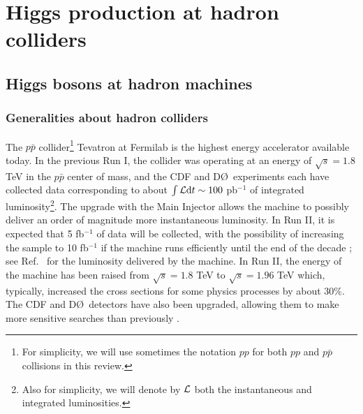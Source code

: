 
\section{Higgs production at hadron colliders}
\setcounter{equation}{0}
\renewcommand{\theequation}{3.\arabic{equation}}

\vspace*{-2mm}
\subsection{Higgs bosons at hadron machines}

\subsubsection{Generalities about hadron colliders}

The $p\bar{p}$ collider\footnote{For simplicity, we will use sometimes the
notation $pp$ for both $pp$ and $p\bar{p}$ collisions in this review.} Tevatron
at Fermilab is the highest energy accelerator available today. In the previous
Run I, the collider was operating at an energy of $\sqrt{s}=1.8$ TeV in the
$p\bar p$ center of mass, and the CDF and D\O\ experiments each have collected
data corresponding to about $\int {\cal L}{\rm d}t\sim 100$ pb$^{-1}$ of
integrated luminosity\footnote{Also for simplicity, we will denote by ${\cal
L}$ both the instantaneous and integrated luminosities.}. The upgrade with the
Main Injector allows the machine to possibly deliver an order of magnitude more
instantaneous luminosity. In Run II, it is expected that 5 fb$^{-1}$ of data
will be collected, with the possibility of increasing the sample to 10
fb$^{-1}$ if the machine runs efficiently until the end of the decade
\cite{Garbincius-Moriond};  see Ref.~\cite{Lumi-TeV} for the luminosity
delivered by the machine.  In Run II, the energy of the machine has been raised
from $\sqrt s = 1.8$ TeV to $\sqrt s = 1.96$ TeV which, typically, increased
the cross sections for some physics processes by about 30\%. The CDF and D\O\
detectors have also been upgraded, allowing them to make more sensitive
searches than previously \cite{pp-HV-expT,Higgs-TeV}.\s

